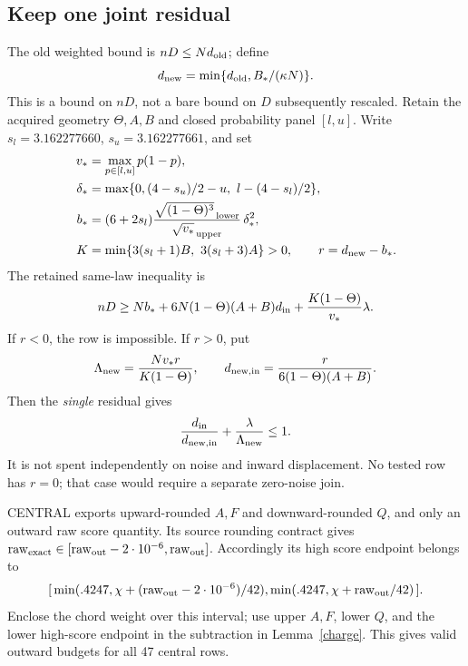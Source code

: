 \documentclass[11pt]{article}
\begin{document}
\subsection{Keep one joint residual}
The old weighted bound is $nD\le Nd_{\rm old}$; define
\[
 d_{\rm new}=\min\{d_{\rm old},B_*/(\kappa N)\}.
\]
This is a bound on $nD$, not a bare bound on $D$ subsequently rescaled.
Retain the acquired geometry $\Theta,A,B$ and closed probability panel
$[l,u]$. Write $s_l=3.162277660$, $s_u=3.162277661$, and set
\begin{align*}
 v_*&=\max_{p\in[l,u]}p(1-p),\\
 \delta_*&=\max\{0,(4-s_u)/2-u,\ l-(4-s_l)/2\},\\
 b_*&=(6+2s_l)
   \frac{\sqrt{(1-\Theta)^3}_{\,\rm lower}}
        {\sqrt{v_*}_{\,\rm upper}}\,\delta_*^2,\\
 K&=\min\{3(s_l+1)B,\ 3(s_l+3)A\}>0,\qquad
 r=d_{\rm new}-b_* .
\end{align*}
The retained same-law inequality is
\[
 nD\ge Nb_*+6N(1-\Theta)(A+B)d_{\rm in}
                 +\frac{K(1-\Theta)}{v_*}\lambda.
\]
If $r<0$, the row is impossible. If $r>0$, put
\[
 \Lambda_{\rm new}=\frac{Nv_*r}{K(1-\Theta)},\qquad
 d_{{\rm new,in}}=\frac{r}{6(1-\Theta)(A+B)}.
\]
Then the \emph{single} residual gives
\[
 \frac{d_{\rm in}}{d_{{\rm new,in}}}
       +\frac{\lambda}{\Lambda_{\rm new}}\le1.
\]
It is not spent independently on noise and inward displacement. No tested
row has $r=0$; that case would require a separate zero-noise join.

CENTRAL exports upward-rounded $A,F$ and downward-rounded $Q$, and only an
outward raw score quantity. Its source rounding contract gives
$\mathrm{raw}_{\rm exact}\in[\mathrm{raw}_{\rm out}-2\cdot10^{-6},
\mathrm{raw}_{\rm out}]$. Accordingly its high score endpoint belongs to
\[
 [\,\min(.4247,\chi+(\mathrm{raw}_{\rm out}-2\cdot10^{-6})/42),
    \min(.4247,\chi+\mathrm{raw}_{\rm out}/42)\,].
\]
Enclose the chord weight over this interval; use upper $A,F$, lower $Q$,
and the lower high-score endpoint in the subtraction in
Lemma~\ref{charge}. This gives valid outward budgets for all 47 central rows.
\end{document}
